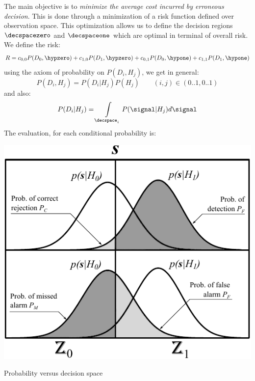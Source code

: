 The main objective is to \emph{minimize the average cost incurred by erroneous decision}. This is done through a minimization of a risk function defined over observation space. This optimization allows us to define the decision regions $\decspacezero$ and $\decspaceone$ which are optimal in terminal of overall risk. We define the risk:
\begin{equation}
R = c_{0,0} P(D_0, \hypzero) + c_{1,0} P(D_1, \hypzero) + c_{0,1} P(D_0, \hypone) + c_{1,1} P(D_1, \hypone)
\end{equation}
using the axiom of probability on $P(D_i,H_j)$, we get in general:
\begin{equation}
P(D_i,H_j) = P(D_i|H_j) P(H_j) \qquad (i,j) \in (0..1,0..1)
\end{equation}
and also:
\begin{equation}
P(D_i|H_j) = \int\limits_{\decspace_i}P(\signal|H_j)d\signal
\end{equation}
The evaluation, for each conditional probability is:
\begin{marginfigure}
	\centering
	\includegraphics[scale=0.55]{ch3/img/probcurves.pdf}
	\caption{Probability versus decision space}
\end{marginfigure}
